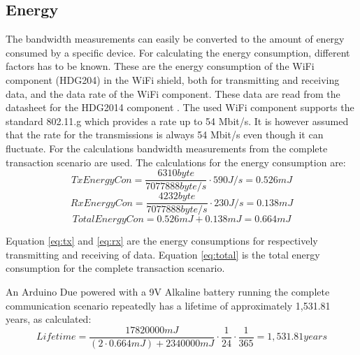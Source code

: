 \subsection{Energy}
The bandwidth measurements can easily be converted to the amount of energy consumed by a specific device. For calculating the energy consumption, different factors has to be known. These are the energy consumption of the WiFi component (HDG204) in the WiFi shield, both for transmitting and receiving data, and the data rate of the WiFi component. These data are read from the datasheet for the HDG2014 component \cite{hdg204:datasheet}. The used WiFi component supports the standard 802.11.g which provides a rate up to 54 Mbit/s. It is however assumed that the rate for the transmissions is always 54 Mbit/s even though it can fluctuate. 
For the calculations bandwidth measurements from the complete transaction scenario are used. 
The calculations for the energy consumption are:
\begin{equation}\label{eq:tx}
TxEnergyCon = \frac{6310 byte}{7077888 byte/s } \cdot 590 J/s = 0.526 mJ   
\end{equation}
\begin{equation}\label{eq:rx}
RxEnergyCon = \frac{4232 byte}{7077888 byte/s } \cdot 230 J/s = 0.138 mJ   
\end{equation}
\begin{equation}\label{eq:total}
TotalEnergyCon = 0.526 mJ + 0.138 mJ =0.664 mJ 
\end{equation}

Equation \ref{eq:tx} and \ref{eq:rx} are the energy consumptions for respectively transmitting and receiving of data. 
Equation \ref{eq:total} is the total energy consumption for the complete transaction scenario.

An Arduino Due powered with a 9V Alkaline battery running the complete communication scenario repeatedly has a lifetime of approximately 1,531.81 years, as calculated: 
\begin{equation}\label{eq:years}
Lifetime = \frac{17820000 mJ }{(2 \cdot 0.664 mJ) + 2340000 mJ } \cdot \frac{1}{24} \cdot \frac{1}{365} = 1,531.81 years
\end{equation}


